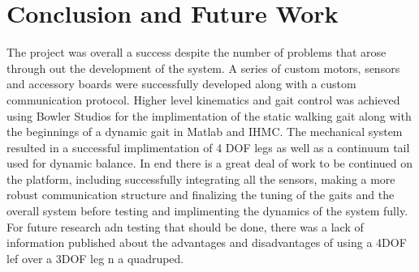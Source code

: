 \section{Conclusion and Future Work}

The project was overall a success despite the number of problems that arose through out the development of the system. A series of custom motors, sensors and accessory boards were successfully developed along with a custom communication protocol. Higher level kinematics and gait control was achieved using Bowler Studios for the implimentation of the static walking gait along with the beginnings of a dynamic gait in Matlab and IHMC. The mechanical system resulted in a successful implimentation of 4 DOF legs as well as a continuum tail used for dynamic balance. In end there is a great deal of work to be continued on the platform, including successfully integrating all the sensors, making a more robust communication structure and finalizing the tuning of the gaits and the overall system before testing and implimenting the dynamics of the system fully. For future research adn testing that should be done, there was a lack of information published about the advantages and disadvantages of using a 4DOF lef over a 3DOF leg n a quadruped.
